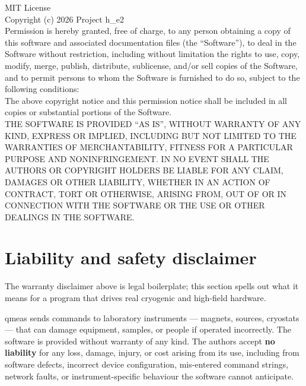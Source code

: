 \documentclass[11pt,a4paper]{article}
\begin{document}
\begin{license}
MIT License\\[4pt]

Copyright (c) 2026 Project h\_e2\\[4pt]

Permission is hereby granted, free of charge, to any person obtaining a copy
of this software and associated documentation files (the ``Software''), to
deal in the Software without restriction, including without limitation the
rights to use, copy, modify, merge, publish, distribute, sublicense, and/or
sell copies of the Software, and to permit persons to whom the Software is
furnished to do so, subject to the following conditions:\\[4pt]

The above copyright notice and this permission notice shall be included in
all copies or substantial portions of the Software.\\[4pt]

THE SOFTWARE IS PROVIDED ``AS IS'', WITHOUT WARRANTY OF ANY KIND, EXPRESS OR
IMPLIED, INCLUDING BUT NOT LIMITED TO THE WARRANTIES OF MERCHANTABILITY,
FITNESS FOR A PARTICULAR PURPOSE AND NONINFRINGEMENT. IN NO EVENT SHALL THE
AUTHORS OR COPYRIGHT HOLDERS BE LIABLE FOR ANY CLAIM, DAMAGES OR OTHER
LIABILITY, WHETHER IN AN ACTION OF CONTRACT, TORT OR OTHERWISE, ARISING
FROM, OUT OF OR IN CONNECTION WITH THE SOFTWARE OR THE USE OR OTHER DEALINGS
IN THE SOFTWARE.
\end{license}

\section{Liability and safety disclaimer}

The warranty disclaimer above is legal boilerplate; this section spells out
what it means for a program that drives real cryogenic and high-field
hardware.

\begin{warn}
qmeas sends commands to laboratory instruments --- magnets, sources,
cryostats --- that can damage equipment, samples, or people if operated
incorrectly. The software is provided without warranty of any kind. The
authors accept \textbf{no liability} for any loss, damage, injury, or cost
arising from its use, including from software defects, incorrect device
configuration, mis-entered command strings, network faults, or
instrument-specific behaviour the software cannot anticipate.
\end{warn}
\end{document}
